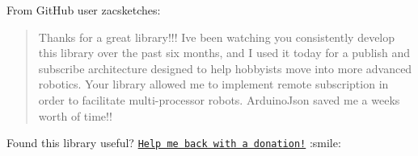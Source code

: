 From Git\+Hub user {\ttfamily zacsketches}\+:

\begin{quote}
Thanks for a great library!!! I\textquotesingle{}ve been watching you consistently develop this library over the past six months, and I used it today for a publish and subscribe architecture designed to help hobbyists move into more advanced robotics. Your library allowed me to implement remote subscription in order to facilitate multi-\/processor robots. Arduino\+Json saved me a week\textquotesingle{}s worth of time!! \end{quote}




Found this library useful? \href{https://www.paypal.com/cgi-bin/webscr?cmd=_donations&business=donate%40benoitblanchon%2efr&lc=GB&item_name=Benoit%20Blanchon&item_number=Arduino%20JSON&currency_code=EUR&bn=PP%2dDonationsBF%3abtn_donate_LG%2egif%3aNonHosted}{\tt Help me back with a donation!} \+:smile\+: 